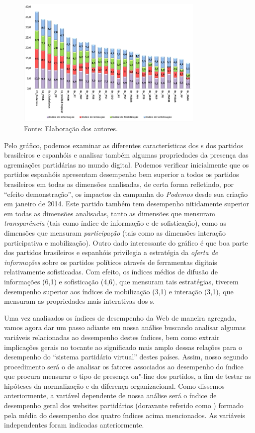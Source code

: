 \begin{figure}[!ht]
\centering
 \includegraphics[width=90mm]{./imgs/graf1.png}
\caption{Fonte: Elaboração dos autores.}
\end{figure}

Pelo gráfico, podemos examinar as diferentes características dos s dos
partidos brasileiros e espanhóis e analisar também algumas propriedades
da presença das agremiações partidárias no mundo digital. Podemos
verificar inicialmente que os partidos espanhóis apresentam desempenho
bem superior a todos os partidos brasileiros em todas as dimensões
analisadas, de certa forma refletindo, por ``efeito demonstração'', os
impactos da campanha do \emph{Podemos} desde sua criação em janeiro de
2014. Este partido também tem desempenho nitidamente superior em todas
as dimensões analisadas, tanto as dimensões que mensuram
\emph{transparência} (tais como índice de informação e de sofisticação),
como as dimensões que mensuram \emph{participação} (tais como as
dimensões interação participativa e mobilização). Outro dado
interessante do gráfico é que boa parte dos partidos brasileiros e
espanhóis privilegia a estratégia da \emph{oferta de informações} sobre
os partidos políticos através de ferramentas digitais relativamente
sofisticadas. Com efeito, os índices médios de difusão de informações
(6,1) e sofisticação (4,6), que mensuram tais estratégias, tiverem
desempenho superior aos índices de mobilização (3,1) e interação (3,1),
que mensuram as propriedades mais interativas dos s.

Uma vez analisados os índices de desempenho da Web de maneira agregada,
vamos agora dar um passo adiante em nossa análise buscando analisar
algumas variáveis relacionadas ao desempenho destes índices, bem como
extrair implicações gerais no tocante ao significado mais amplo dessas
relações para o desempenho do ``sistema partidário virtual'' destes
países. Assim, nosso segundo procedimento será o de analisar os fatores
associados ao desempenho do índice que procura mensurar o tipo de
presença on"-line dos partidos, a fim de testar as hipóteses da
normalização e da diferença organizacional. Como dissemos anteriormente,
a variável dependente de nossa análise será o índice de desempenho geral
dos websites partidários (doravante referido como ) formado pela
média do desempenho dos quatro índices acima mencionados. As variáveis
independentes foram indicadas anteriormente.


